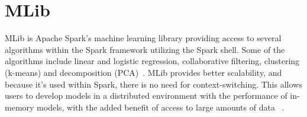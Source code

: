 \section{MLib}
MLib is Apache Spark's machine learning library providing 
access to several algorithms within the Spark framework
utilizing the Spark shell. Some of the algorithms include 
linear and logistic regression, collaborative filtering, 
clustering (k-means) and decomposition (PCA)~\cite{hid-sp18-407-mlib-1}.
MLib provides better scalability, and because it's used within Spark, 
there is no need for context-switching. This allows users to develop
models in a distributed environment with the performance of in-memory 
models, with the added benefit of access to large amounts of data
~\cite{hid-sp18-407-mlib-1}.

